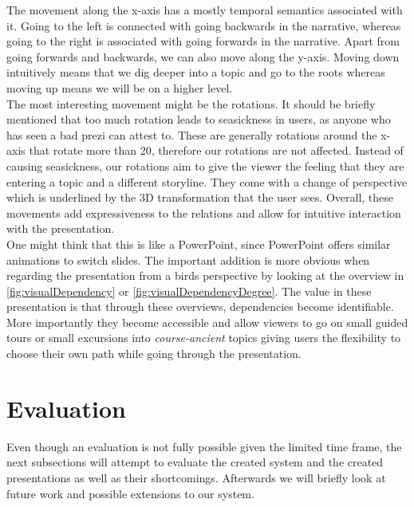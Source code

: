 \documentclass[twoside, 12pt]{article}
\begin{document}
The movement along the x-axis has a mostly temporal semantics associated with it. Going to the left is connected with going backwards in the narrative, whereas going to the right is associated with going forwards in the narrative. Apart from going forwards and backwards, we can also move along the y-axis. Moving down intuitively means that we dig deeper into a topic and go to the roots whereas moving up means we will be on a higher level.\\

The most interesting movement might be the rotations. It should be briefly mentioned that too much rotation leads to seasickness in users, as anyone who has seen a bad prezi can attest to. These are generally rotations around the x-axis that rotate more than 20\degree, therefore our rotations are not affected. Instead of causing seasickness, our rotations aim to give the viewer the feeling that they are entering a topic and a different storyline. They come with a change of perspective which is underlined by the 3D transformation that the user sees. Overall, these movements add expressiveness to the relations and allow for intuitive interaction with the presentation.\\

One might think that this is like a PowerPoint, since PowerPoint offers similar animations to switch slides. The important addition is more obvious when regarding the presentation from a birds perspective by looking at the overview in \autoref{fig:visualDependency} or \autoref{fig:visualDependencyDegree}. The value in these presentation is that through these overviews, dependencies become identifiable. More importantly they become accessible and allow viewers to go on small guided tours or small excursions into \textit{course-ancient} topics giving users the flexibility to choose their own path while going through the presentation.

\section{Evaluation}
\label{sec:eval}

Even though an evaluation is not fully possible given the limited time frame, the next subsections will attempt to evaluate the created system and the created presentations as well as their shortcomings. Afterwards we will briefly look at future work and possible extensions to our system.\\
\end{document}
